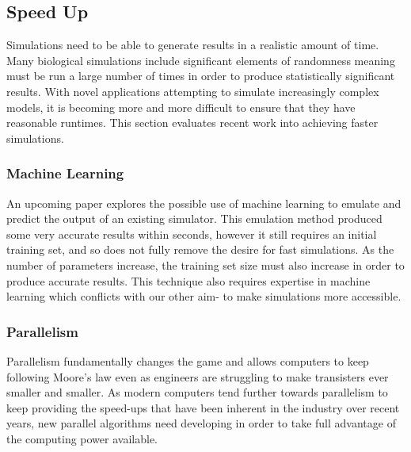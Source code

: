 \documentclass{UoYCSproject}
\begin{document}
\subsection{Speed Up}
Simulations need to be able to generate results in a realistic amount of time.
Many biological simulations include significant elements of randomness meaning must be run a large number of times in order to produce statistically significant results\cite{spartan}.
With novel applications attempting to simulate increasingly complex models, it is becoming more and more difficult to ensure that they have reasonable runtimes.
This section evaluates recent work into achieving faster simulations.

\subsubsection{Machine Learning}
An upcoming paper explores the possible use of machine learning to emulate and predict the output of an existing simulator\cite{kieran_machine_learning}.
This emulation method produced some very accurate results within seconds, however it still requires an initial training set, and so does not fully remove the desire for fast simulations.
As the number of parameters increase, the training set size must also increase in order to produce accurate results.
This technique also requires expertise in machine learning which conflicts with our other aim- to make simulations more accessible.



\subsubsection{Parallelism}
Parallelism fundamentally changes the game and allows computers to keep following Moore's law even as engineers are struggling to make transisters ever smaller and smaller\cite{concurrency_revolution}.
As modern computers tend further towards parallelism to keep providing the speed-ups that have been inherent in the industry over recent years, new parallel algorithms need developing in order to take full advantage of the computing power available.
\end{document}
